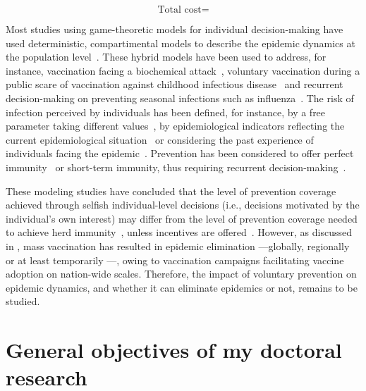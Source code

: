 
\begin{equation}
	\text{Total cost} = 
\end{equation}


Most studies using game-theoretic models for individual decision-making have used deterministic, compartimental models to describe the epidemic dynamics at the population level~\cite[]{Bauch2003,Bauch2004,Breban2006,DOnofrio2007,Vardavas2007,Galvani2007,Breban2011,Liu2012}. These hybrid models have been used to address, for instance, vaccination facing a biochemical attack~\cite[]{Bauch2003}, voluntary vaccination during a public scare of vaccination against childhood infectious disease~\cite[]{Bauch2004} and recurrent decision-making on preventing seasonal infections such as influenza~\cite[]{Breban2006,Galvani2007}. The risk of infection perceived by individuals has been defined, for instance, by a free parameter taking different values~\cite[]{Bauch2004}, by epidemiological indicators reflecting the current epidemiological situation~\cite[]{Bauch2003,DOnofrio2007,Breban2011,Liu2012} or considering the past experience of individuals facing the epidemic~\cite[]{Breban2006,Vardavas2007,DOnofrio2007}. Prevention has been considered to offer perfect immunity~\cite[]{Bauch2003,Bauch2004,DOnofrio2007} or short-term immunity, thus requiring recurrent decision-making~\cite[]{Breban2006}. 

These modeling studies have concluded that the level of prevention coverage achieved through selfish individual-level decisions  (i.e., decisions motivated by the individual's own interest) may differ from the level of prevention coverage needed to achieve herd immunity~\cite[]{Bauch2003,Bauch2004,Breban2006,Galvani2007,Breban2011}, unless incentives are offered~\cite[]{Vardavas2007,Liu2012}. %
However, as discussed in , mass vaccination has resulted in epidemic elimination ---globally, regionally or at least temporarily ---, owing to vaccination campaigns facilitating vaccine adoption on nation-wide scales. Therefore, the impact of voluntary prevention on epidemic dynamics, and whether it can eliminate epidemics or not, remains to be studied.

\section{General objectives of my doctoral research}
\label{Intro:Objectives} 

